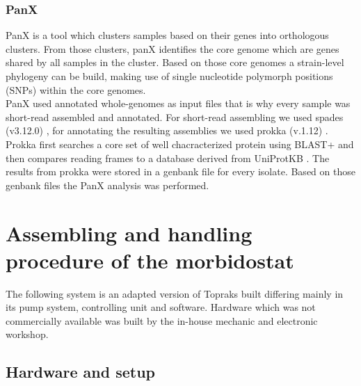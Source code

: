 \subsubsection{PanX}
PanX is a tool which clusters samples based on their genes into orthologous clusters. From those clusters, panX identifies the core genome which are genes shared by all samples in the cluster. Based on those core genomes a strain-level phylogeny can be build, making use of single nucleotide polymorph positions (SNPs) within the core genomes. \\ 
PanX used annotated whole-genomes as input files that is why every sample was short-read assembled and annotated. For short-read assembling we used spades (v3.12.0) \cite{nurk_assembling_2013}, for annotating the resulting assemblies we used prokka (v.1.12) \cite{seemann_prokka:_2014}. Prokka first searches a core set of well chacracterized protein using BLAST+ and then compares reading frames to a database derived from UniProtKB \cite{seemann_:zap:_2019}. The results from prokka were stored in a genbank file for every isolate. Based on those genbank files the PanX analysis was performed. \\



\newpage



\section{Assembling and handling procedure of the morbidostat}
The following system is an adapted version of Topraks built differing mainly in its pump system, controlling unit and software. Hardware which was not commercially available was built by the in-house mechanic and electronic workshop.

\subsection{Hardware and setup}

